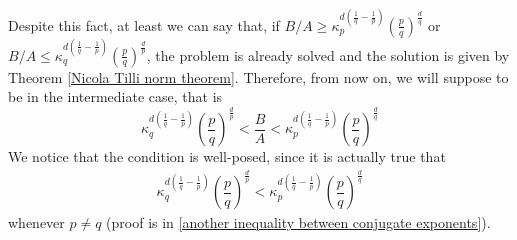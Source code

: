 \documentclass[corpo=11pt, stile=classica, tipotesi=custom,
greek, evenboxes, english]{toptesi}
\numberwithin{equation}{chapter}
\theoremstyle{remark}
\begin{document}
Despite this fact, at least we can say that, if $B/A \geq \kappa_p^{d\left(\frac{1}{q}-\frac{1}{p}\right)}\left(\frac{p}{q}\right)^{\frac{d}{q}}$ or $B/A \leq \kappa_q^{d\left(\frac{1}{q}-\frac{1}{p}\right)}\left(\frac{p}{q}\right)^{\frac{d}{p}}$, the problem is already solved and the solution is given by Theorem \ref{Nicola Tilli norm theorem}. Therefore, from now on, we will suppose to be in the intermediate case, that is
\begin{equation}\label{intermediate regime}
	\kappa_q^{d\left(\frac{1}{q}-\frac{1}{p}\right)} \left(\dfrac{p}{q}\right)^{\frac{d}{p}} < \dfrac{B}{A} < \kappa_p^{d\left(\frac{1}{q}-\frac{1}{p}\right)} \left(\dfrac{p}{q}\right)^{\frac{d}{q}}
\end{equation}
We notice that the condition is well-posed, since it is actually true that
\begin{align}\label{another inequality between conjugate exponents original}
	\kappa_q^{d\left(\frac{1}{q}-\frac{1}{p}\right)} \left(\dfrac{p}{q}\right)^{\frac{d}{p}} < \kappa_p^{d\left(\frac{1}{q}-\frac{1}{p}\right)} \left(\dfrac{p}{q}\right)^{\frac{d}{q}}
\end{align}
whenever $p \neq q$ (proof is in \ref{another inequality between conjugate exponents}).
\end{document}
